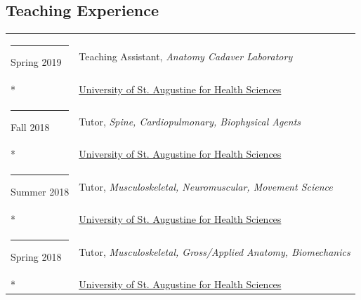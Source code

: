 \documentclass[margin,line]{res}
\begin{document}
\begin{resume}
\section{\sc Teaching Experience}
\begin{longtable}{@{}p{0.7in}p{4in}}\rule{-1mm}{4.5mm}
\hspace*{-4mm} Spring 2019 & Teaching Assistant, \textit{Anatomy Cadaver Laboratory}\\*
\hspace*{-4mm} & \hspace{4mm} \href{https://www.usa.edu/}{University of St. Augustine for Health Sciences}\\
\hspace*{-4mm} \rule{-1mm}{5mm} Fall 2018 & Tutor, \textit{Spine, Cardiopulmonary, Biophysical Agents}\\*
\hspace*{-4mm} & \hspace{4mm} \href{https://www.usa.edu/}{University of St. Augustine for Health Sciences}\\
\hspace*{-4mm} \rule{-1mm}{5mm} Summer 2018 & Tutor, \textit{Musculoskeletal, Neuromuscular, Movement Science}\\*
\hspace*{-4mm} & \hspace{4mm} \href{https://www.usa.edu/}{University of St. Augustine for Health Sciences}\\
\hspace*{-4mm} \rule{-1mm}{5mm} Spring 2018 & Tutor, \textit{Musculoskeletal, Gross/Applied Anatomy, Biomechanics}\\*
\hspace*{-4mm} & \hspace{4mm} \href{https://www.usa.edu/}{University of St. Augustine for Health Sciences}\\
\end{longtable}


\end{resume}
\end{document}
